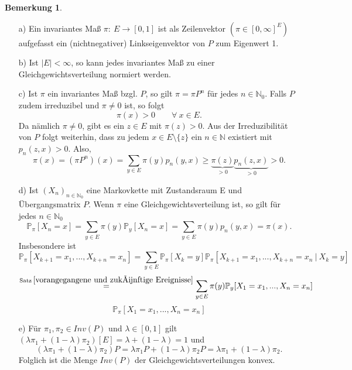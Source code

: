 \documentclass[a4paper,12pt]{scrartcl}
\theoremstyle{definition}
\newtheorem{bem}{Bemerkung}[section]
\begin{document}
\begin{bem}

\label{Auflistende Bemerkung zu invarianten Maßen}
\mbox{}
\begin{itemize}
\item[a)] Ein invariantes Maß $\pi : \: E \to [0,1]$ ist als Zeilenvektor $(\pi \in [0,\infty]^{E})$ aufgefasst ein (nichtnegativer) Linkseigenvektor von $P$ zum Eigenwert 1.
\item[b)] Ist $\vert E \vert < \infty$, so kann jedes invariantes Maß zu einer Gleichgewichtsverteilung normiert werden.
\item[c)] Ist $\pi$ ein invariantes Maß bzgl. $P$, so gilt $\pi = \pi P^{n}$ für jedes $n \in \mathbb{N}_{0}$. Falls $P$ zudem irreduzibel und $\pi \neq 0$ ist, so folgt
\begin{equation*}
\pi(x) > 0 \qquad \forall \: x \in E.
\end{equation*}
Da nämlich $\pi \neq 0$, gibt es ein $z \in E$ mit $\pi (z) > 0$. Aus der Irreduzibilität von $P$ folgt weiterhin, dass zu jedem $x \in E \setminus \lbrace z \rbrace$ ein $n \in \mathbb{N}$ existiert mit $p_{n}(z,x)>0$. Also,
\begin{equation*}
\pi (x) = (\pi P^{n})(x) = \sum_{y \in E} \pi (y) p_{n} (y,x) \geq
\underbrace{\pi (z)}_{>0} \underbrace{ p_{n} (z,x)}_{>0} > 0.
\end{equation*} 
\item[d)] Ist $(X_{n})_{n \in \mathbb{N}_{0}}$ eine Markovkette mit Zustandsraum E und Übergangsmatrix $P$. Wenn $\pi$ eine Gleichgewichtsverteilung ist, so gilt für jedes $n \in \mathbb{N}_{0}$
\begin{equation*}
\mathbb{P}_{\pi}[X_{n} = x] = \sum_{y \in E} \pi (y) \mathbb{P}_{y}[X_{n} = x] = \sum_{y \in E} \pi (y) p_{n}(y,x) = \pi (x).  
\end{equation*}
Insbesondere ist
\begin{equation*}
\mathbb{P}_{\pi} [X_{k+1} = x_{1},...,X_{k+n} = x_{n}] = \sum_{y \in E} \mathbb{P}_{\pi} [X_{k} = y] \mathbb{P}_{\pi} [X_{k+1} = x_{1},...,X_{k+n} = x_{n} \: | \: X_{k} = y]
\end{equation*}
\begin{equation*}
\stackrel{\mathrm{Satz} \: \ref{vorangegangene und zukünftige Ereignisse}}{=} \sum_{y \in E} \pi (y)  \mathbb{P}_{y} [X_{1} = x_{1},...,X_{n} = x_{n}]
\end{equation*}
\begin{equation*}
\mathbb{P}_{\pi} [X_{1} = x_{1},...,X_{n} = x_{n}]
\end{equation*}
\item[e)] Für $\pi_{1}, \pi_{2} \in Inv(P)$ und $\lambda \in [0,1]$ gilt $(\lambda \pi_{1} + (1- \lambda) \pi_{2})[E] = \lambda + (1-\lambda)=1$ und
\begin{equation*}
(\lambda \pi_{1} + (1- \lambda) \pi_{2})P = \lambda \pi_{1}P + (1- \lambda) \pi_{2}P = \lambda \pi_{1} + (1- \lambda) \pi_{2}.
\end{equation*}
Folglich ist die Menge $Inv(P)$ der Gleichgewichtsverteilungen konvex.
\end{itemize}
\end{bem}
\end{document}
